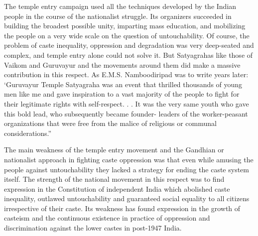 The temple entry campaign used all the techniques developed by the Indian people in the course of the nationalist struggle. Its organizers succeeded in building the broadest possible unity, imparting mass education, and mobilizing the people on a very wide scale on the question of untouchability. Of course, the problem of caste inequality, oppression and degradation was very deep-seated and complex, and temple entry alone could not solve it. But Satyagrahas like those of Vaikom and Guruvayur and the movements around them did make a massive contribution in this respect. As E.M.S. Namboodiripad was to write years later: ‘Guruvayur Temple Satyagraha was an event that thrilled thousands of young men like me and gave inspiration to a vast majority of the people to fight for their legitimate rights with self-respect. . . It was the very same youth who gave this bold lead, who subsequently became founder- leaders of the worker-peasant organizations that were free from the malice of religious or communal considerations.”

The main weakness of the temple entry movement and the Gandhian or nationalist approach in fighting caste oppression was that even while amusing the people against untouchability they lacked a strategy for ending the caste system itself. The strength of the national movement in this respect was to find expression in the Constitution of independent India which abolished caste inequality, outlawed untouchability and guaranteed social equality to all citizens irrespective of their caste. Its weakness has found expression in the growth of casteism and the continuous existence in practice of oppression and discrimination against the lower castes in post-1947 India.
